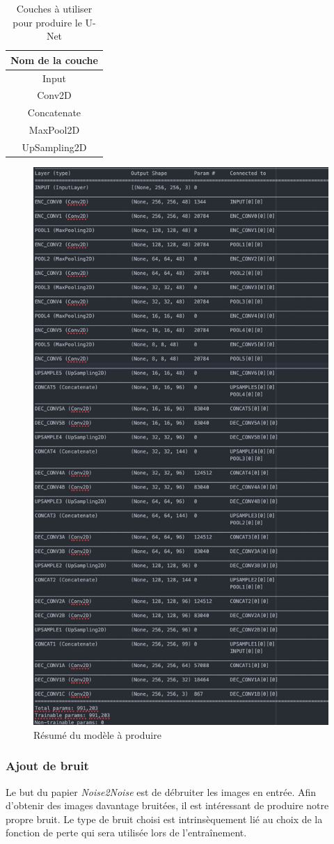 \documentclass{article}
\begin{document}
\bigbreak
\begin{table}[H]
\centering
\begin{tabular}{|c|}
  \hline
  Nom de la couche \\
  \hline
  Input \\
  Conv2D \\
  Concatenate \\
  MaxPool2D \\
  UpSampling2D \\
  \hline
\end{tabular}
\caption{Couches à utiliser pour produire le U-Net}
\label{tab:couches}
\end{table}

\bigbreak
\begin{figure}[H]
  \centering
  \includegraphics[width=0.5\columnwidth]{figures/summary}
  \caption{Résumé du modèle à produire}
  \label{fig:summary}
\end{figure}

\subsubsection{Ajout de bruit}
Le but du papier \textit{Noise2Noise} \citep{Noise2Noise} est de débruiter les images en entrée. Afin d'obtenir des images davantage bruitées, il est intéressant de produire notre propre bruit. Le type de bruit choisi est intrinsèquement lié au choix de la fonction de perte qui sera utilisée lors de l'entraînement.
\end{document}
